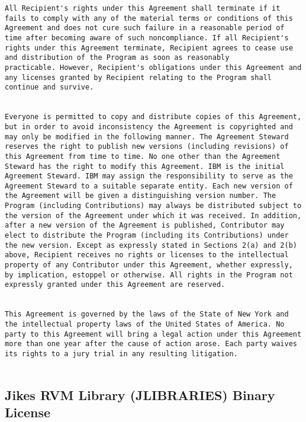 \begin{verbatim}
All Recipient's rights under this Agreement shall terminate if it
fails to comply with any of the material terms or conditions of this
Agreement and does not cure such failure in a reasonable period of
time after becoming aware of such noncompliance. If all Recipient's
rights under this Agreement terminate, Recipient agrees to cease use
and distribution of the Program as soon as reasonably
practicable. However, Recipient's obligations under this Agreement and
any licenses granted by Recipient relating to the Program shall
continue and survive.  


Everyone is permitted to copy and distribute copies of this Agreement,
but in order to avoid inconsistency the Agreement is copyrighted and
may only be modified in the following manner. The Agreement Steward
reserves the right to publish new versions (including revisions) of
this Agreement from time to time. No one other than the Agreement
Steward has the right to modify this Agreement. IBM is the initial
Agreement Steward. IBM may assign the responsibility to serve as the
Agreement Steward to a suitable separate entity. Each new version of
the Agreement will be given a distinguishing version number. The
Program (including Contributions) may always be distributed subject to
the version of the Agreement under which it was received. In addition,
after a new version of the Agreement is published, Contributor may
elect to distribute the Program (including its Contributions) under
the new version. Except as expressly stated in Sections 2(a) and 2(b)
above, Recipient receives no rights or licenses to the intellectual
property of any Contributor under this Agreement, whether expressly,
by implication, estoppel or otherwise. All rights in the Program not
expressly granted under this Agreement are reserved.  


This Agreement is governed by the laws of the State of New York and
the intellectual property laws of the United States of America. No
party to this Agreement will bring a legal action under this Agreement
more than one year after the cause of action arose. Each party waives
its rights to a jury trial in any resulting litigation.  


\end{verbatim}

\JikesTMFooter

\subsection{Jikes RVM Library (JLIBRARIES) Binary License}

